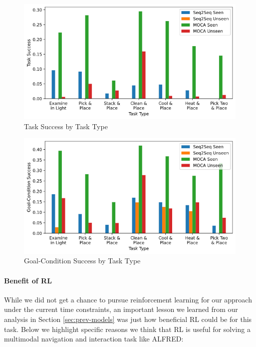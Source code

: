 \documentclass[11pt,a4paper]{article}
\begin{document}
\begin{figure}[H]
\centering
\includegraphics[scale=0.33]{figures/ts_by_type.png}
\caption{Task Success by Task Type}
\label{fig:ts-by-type}
\end{figure}

\begin{figure}[H]
\centering
\includegraphics[scale=0.33]{figures/gcs_by_type.png}
\caption{Goal-Condition Success by Task Type}
\label{fig:gcs-by-type}
\end{figure}

\paragraph{Benefit of RL} While we did not get a chance to pursue reinforcement learning for our approach under the current time constraints, an important lesson we learned from our analysis in Section \ref{sec:prev-models} was just how beneficial RL could be for this task. Below we highlight specific reasons we think that RL is useful for solving a multimodal navigation and interaction task like ALFRED:
\end{document}
